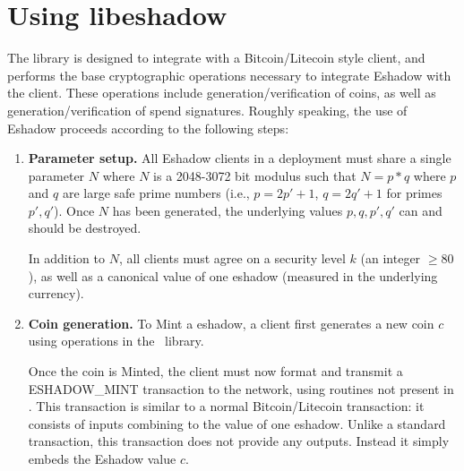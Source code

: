 \section{Using libeshadow}

The \libeshadow library is designed to integrate with a Bitcoin/Litecoin style client, and performs the base cryptographic operations necessary to integrate Eshadow with the client. These operations include generation/verification of coins, as well as generation/verification of spend signatures. Roughly speaking, the use of Eshadow proceeds according to the following steps:

\begin{enumerate}
\item {\bf Parameter setup.} All Eshadow clients in a deployment must share a single parameter $N$ where $N$ is a 2048-3072 bit modulus such that $N = p*q$ where $p$ and $q$ are large safe prime numbers (i.e., $p = 2p'+1$, $q = 2q'+1$ for primes $p', q'$). Once $N$ has been generated, the underlying values $p, q, p', q'$ can and should be destroyed.
 
In addition to $N$, all clients must agree on a security level $k$ (an integer $\ge 80$), as well as a canonical value of one eshadow (measured in the underlying currency).

\item {\bf Coin generation.} To Mint a eshadow, a client first generates a new coin $c$ using operations in the \libeshadow~library. 

Once the coin is Minted, the client must now format and transmit a \textsf{ESHADOW\_MINT} transaction to the network, using routines not present in \libeshadow. This transaction is similar to a normal Bitcoin/Litecoin transaction: it consists of inputs combining to the value of one eshadow. Unlike a standard transaction, this transaction does not provide any outputs. Instead it simply embeds the Eshadow value $c$. 
 
\end{enumerate} 